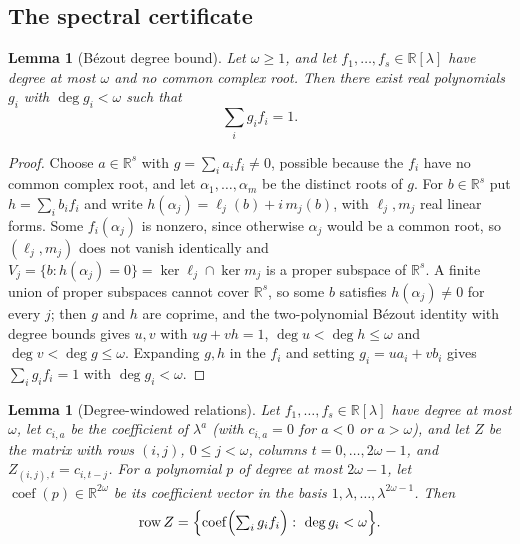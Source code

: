 \documentclass[journal]{IEEEtran}
\theoremstyle{plainn}
\newtheorem{lem}[thm]{Lemma}
\theoremstyle{remark}
\begin{document}
\subsection{The spectral certificate}\label{sec:spectrum}

\begin{lem}[B\'ezout degree bound]\label{lem:bezout}\label{sec:bezout}
Let $\omega\ge1$, and let $f_1,\ldots,f_s\in\mathbb R[\lambda]$ have
degree at most $\omega$ and no common complex root. Then there exist
real polynomials $g_i$ with $\deg g_i<\omega$ such that
\begin{equation*}
\sum_i g_i f_i=1 .
\end{equation*}
\end{lem}

\begin{proof}
Choose $a\in\mathbb R^s$ with $g=\sum_i a_if_i\neq0$, possible because the $f_i$ have no common
complex root, and let $\alpha_1,\dots,\alpha_m$ be the distinct roots of $g$. For $b\in\mathbb R^s$ put
$h=\sum_i b_if_i$ and write $h(\alpha_j)=\ell_j(b)+i\,m_j(b)$, with $\ell_j,m_j$ real linear forms.
Some $f_i(\alpha_j)$ is nonzero, since otherwise $\alpha_j$ would be a common root, so $(\ell_j,m_j)$
does not vanish identically and $V_j=\{b:h(\alpha_j)=0\}=\ker\ell_j\cap\ker m_j$ is a proper subspace
of $\mathbb R^s$. A finite union of proper subspaces cannot cover $\mathbb R^s$, so some $b$ satisfies
$h(\alpha_j)\neq0$ for every $j$; then $g$ and $h$ are coprime, and the two-polynomial B\'ezout
identity with degree bounds \cite[Ch.~3]{vzgg13} gives $u,v$ with $ug+vh=1$, $\deg u<\deg h\le\omega$
and $\deg v<\deg g\le\omega$. Expanding $g,h$ in the $f_i$ and setting $g_i=ua_i+vb_i$ gives
$\sum_i g_if_i=1$ with $\deg g_i<\omega$.
\end{proof}

\begin{lem}[Degree-windowed relations]\label{lem:window}
Let $f_1,\dots,f_s\in\mathbb R[\lambda]$ have degree at most $\omega$,
let $c_{i,a}$ be the coefficient of $\lambda^a$ (with $c_{i,a}=0$ for
$a<0$ or $a>\omega$), and let $Z$ be the matrix with rows $(i,j)$,
$0\le j<\omega$, columns $t=0,\dots,2\omega-1$, and
$Z_{(i,j),t}=c_{i,t-j}$. For a polynomial $p$ of degree at most
$2\omega-1$, let $\operatorname{coef}(p)\in\mathbb R^{2\omega}$ be its
coefficient vector in the basis $1,\lambda,\dots,\lambda^{2\omega-1}$.
Then
\begin{equation*}
\operatorname{row}Z=
\Bigl\{
\operatorname{coef}\Bigl(\textstyle\sum_i g_if_i\Bigr)
:\ \deg g_i<\omega
\Bigr\}.
\end{equation*}
\end{lem}
\end{document}
